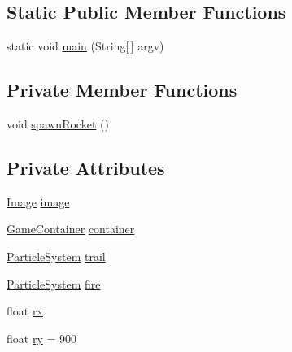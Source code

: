 \subsection*{Static Public Member Functions}
\begin{DoxyCompactItemize}
\item 
static void \mbox{\hyperlink{classorg_1_1newdawn_1_1slick_1_1tests_1_1_pedigree_test_ab301563be4da71da7b579ea5e82eeaeb}{main}} (String\mbox{[}$\,$\mbox{]} argv)
\end{DoxyCompactItemize}
\subsection*{Private Member Functions}
\begin{DoxyCompactItemize}
\item 
void \mbox{\hyperlink{classorg_1_1newdawn_1_1slick_1_1tests_1_1_pedigree_test_a007e9eeb102e627c99150fb945f41b5d}{spawn\+Rocket}} ()
\end{DoxyCompactItemize}
\subsection*{Private Attributes}
\begin{DoxyCompactItemize}
\item 
\mbox{\hyperlink{classorg_1_1newdawn_1_1slick_1_1_image}{Image}} \mbox{\hyperlink{classorg_1_1newdawn_1_1slick_1_1tests_1_1_pedigree_test_a9a83fdf6eb3960d294e976dfd2896a2f}{image}}
\item 
\mbox{\hyperlink{classorg_1_1newdawn_1_1slick_1_1_game_container}{Game\+Container}} \mbox{\hyperlink{classorg_1_1newdawn_1_1slick_1_1tests_1_1_pedigree_test_a803d53a8e6fe77152a4710313def6132}{container}}
\item 
\mbox{\hyperlink{classorg_1_1newdawn_1_1slick_1_1particles_1_1_particle_system}{Particle\+System}} \mbox{\hyperlink{classorg_1_1newdawn_1_1slick_1_1tests_1_1_pedigree_test_ac8fed7baa305c06ec8168b5947d3c2c8}{trail}}
\item 
\mbox{\hyperlink{classorg_1_1newdawn_1_1slick_1_1particles_1_1_particle_system}{Particle\+System}} \mbox{\hyperlink{classorg_1_1newdawn_1_1slick_1_1tests_1_1_pedigree_test_a357e9f5bc41de79c98bb219355467638}{fire}}
\item 
float \mbox{\hyperlink{classorg_1_1newdawn_1_1slick_1_1tests_1_1_pedigree_test_aa8fb781913d72aed3e608682caa8054f}{rx}}
\item 
float \mbox{\hyperlink{classorg_1_1newdawn_1_1slick_1_1tests_1_1_pedigree_test_aa147061226924390ee1ee625aaa7674a}{ry}} = 900
\end{DoxyCompactItemize}
